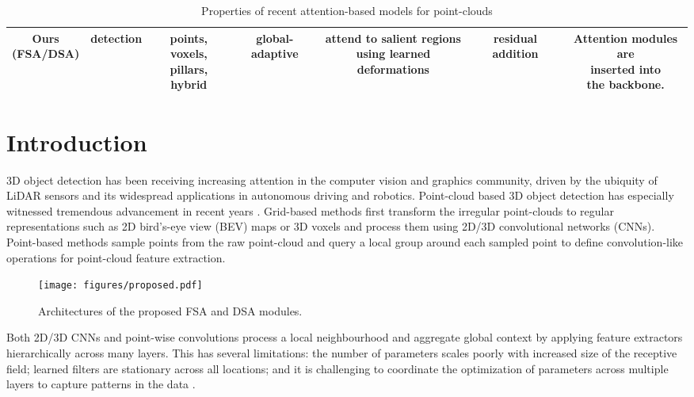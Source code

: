 \documentclass[10pt,twocolumn,letterpaper]{article}
\begin{document}
\begin{table*}[t]
\begin{tabular*}{\textwidth}{c|c|c|c|c|c|c}
        \makecell{\textbf{Ours} \\ (FSA/DSA)} & detection & \makecell{points, voxels, \\ pillars, hybrid} & global-adaptive & \makecell{attend to salient regions \\ using learned deformations} & residual addition & \makecell{Attention modules are \\ inserted into \\ the backbone.}\\ 
        \hline
    \end{tabular*}
    \caption{Properties of recent attention-based models for point-clouds}
    \label{tab:related_work_compare}
    \vspace{-0.3cm}
\end{table*} \section{Introduction}
3D object detection has been receiving increasing attention in the computer vision and graphics community, driven by the ubiquity of LiDAR sensors and its widespread applications in autonomous driving and robotics. Point-cloud based 3D object detection has especially witnessed tremendous advancement in recent years \cite{pointpillars, SECOND, PointRCNN,  PVRCNN, F-PointNet, 3D-SSD, STD, sa-ssd, Voxelnet, votenet}. Grid-based methods first transform the irregular point-clouds to regular representations such as 2D bird's-eye view (BEV) maps or 3D voxels and process them using 2D/3D convolutional networks (CNNs). Point-based methods sample points from the raw point-cloud and query a local group around each sampled  point to define convolution-like operations \cite{pointnetplusplus, kpconv, pointconv} for point-cloud feature extraction.
\begin{figure*}[t]
    \centering
    \texttt{[image: figures/proposed.pdf]}
    \caption{Architectures of the proposed FSA and DSA modules.}
    \label{fig:proposed}
\end{figure*}
Both 2D/3D CNNs and point-wise convolutions process a local neighbourhood and aggregate global context by applying feature extractors hierarchically across many layers. This has several limitations: the number of parameters scales poorly with increased size of the receptive field; learned filters are stationary across all locations; and it is challenging to coordinate the optimization of parameters across multiple layers to capture patterns in the data \cite{sagan}. 
\end{document}
